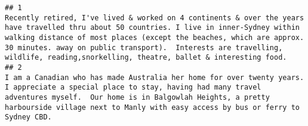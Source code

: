 \documentclass[
]{article}
\begin{document}
\begin{verbatim}
## 1                                                                                                                                                                                                                                                                                                                                                                                                                                                                                                                                                                                                                                                                                                                                                                                                                                                                                                                                                            Recently retired, I've lived & worked on 4 continents & over the years have travelled thru about 50 countries. I live in inner-Sydney within walking distance of most places (except the beaches, which are approx. 30 minutes. away on public transport).  Interests are travelling, wildlife, reading,snorkelling, theatre, ballet & interesting food. 
## 2                                                                                                                                                                                                                                                                                                                                                                                                                                                                                                                                                                                                                                                                                                                                                                                                                                                                                                                                                                                                                                I am a Canadian who has made Australia her home for over twenty years. I appreciate a special place to stay, having had many travel adventures myself.  Our home is in Balgowlah Heights, a pretty harbourside village next to Manly with easy access by bus or ferry to Sydney CBD. 

\end{verbatim}
\end{document}
